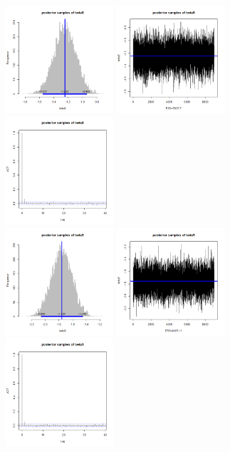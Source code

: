 \documentclass{article}
\begin{document}
\begin{figure}[!h]
    \includegraphics[width=4cm]{beta8_hist.png}
    \includegraphics[width=4cm]{beta8_traceplot.png}
    \includegraphics[width=4cm]{beta8_acf.png} \\
    \includegraphics[width=4cm]{beta9_hist.png}
    \includegraphics[width=4cm]{beta9_traceplot.png}
    \includegraphics[width=4cm]{beta9_acf.png} \\

\end{figure}
\end{document}
